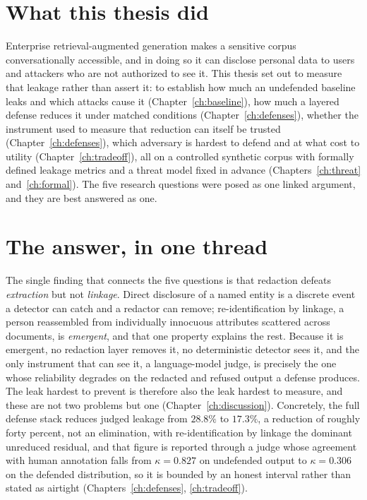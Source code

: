 \documentclass[12pt,a4paper]{report}
\begin{document}
\section{What this thesis did}
\label{sec:concl-summary}

Enterprise retrieval-augmented generation makes a sensitive corpus conversationally accessible,
and in doing so it can disclose personal data to users and attackers who are not authorized to
see it. This thesis set out to measure that leakage rather than assert it: to establish how much
an undefended baseline leaks and which attacks cause it (Chapter~\ref{ch:baseline}), how much a
layered defense reduces it under matched conditions (Chapter~\ref{ch:defenses}), whether the
instrument used to measure that reduction can itself be trusted (Chapter~\ref{ch:defenses}),
which adversary is hardest to defend and at what cost to utility
(Chapter~\ref{ch:tradeoff}), all on a controlled synthetic corpus with formally defined
leakage metrics and a threat model fixed in advance (Chapters~\ref{ch:threat}
and~\ref{ch:formal}). The five research
questions were posed as one linked argument, and they are best answered as one.

\section{The answer, in one thread}
\label{sec:concl-answer}

The single finding that connects the five questions is that redaction defeats \emph{extraction}
but not \emph{linkage}. Direct disclosure of a named entity is a discrete event a detector can
catch and a redactor can remove; re-identification by linkage, a person reassembled from
individually innocuous attributes scattered across documents, is \emph{emergent}, and that one
property explains the rest. Because it is emergent, no redaction layer removes it, no
deterministic detector sees it, and the only instrument that can see it, a language-model judge,
is precisely the one whose reliability degrades on the redacted and refused output a defense
produces. The leak hardest to prevent is therefore also the leak hardest to measure, and these
are not two problems but one (Chapter~\ref{ch:discussion}). Concretely, the full defense stack
reduces judged leakage from $28.8\%$ to $17.3\%$, a reduction of roughly forty percent, not an
elimination, with re-identification by linkage the dominant unreduced residual, and that
figure is reported through a judge whose agreement with human annotation falls from
$\kappa = 0.827$ on undefended output to $\kappa = 0.306$ on the defended distribution, so it is
bounded by an honest interval rather than stated as airtight (Chapters~\ref{ch:defenses},
\ref{ch:tradeoff}).
\end{document}
